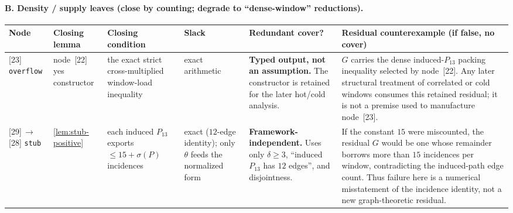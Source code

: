 \documentclass[11pt]{article}
\begin{document}
\paragraph{B. Density / supply leaves (close by counting; degrade to ``dense-window'' reductions).}
{\scriptsize\setlength{\tabcolsep}{3pt}
\begin{longtable}{L{0.09\textwidth} L{0.095\textwidth} L{0.15\textwidth} L{0.08\textwidth} L{0.105\textwidth} L{0.335\textwidth}}
\toprule
\textbf{Node} & \textbf{Closing lemma} & \textbf{Closing condition} & \textbf{Slack} & \textbf{Redundant cover?} & \textbf{Residual counterexample (if false, no cover)} \\
\midrule
\endhead
{[23]} \texttt{overflow} & node~[22] yes constructor & the exact strict cross-multiplied window-load inequality & exact arithmetic & \textbf{Typed output, not an assumption.} The constructor is retained for the later hot/cold analysis. & $G$ carries the dense induced-$P_{13}$ packing inequality selected by node~[22].  Any later structural treatment of correlated or cold windows consumes this retained residual; it is not a premise used to manufacture node~[23]. \\
{[29]}\,$\to$\,{[28]} \texttt{stub} & \cref{lem:stub-positive} & each induced $P_{13}$ exports $\le15+\sigma(P)$ incidences & exact ($12$-edge identity); only $\theta$ feeds the normalized form & \textbf{Framework-independent.} Uses only $\delta\ge3$, ``induced $P_{13}$ has $12$ edges'', and disjointness. & If the constant $15$ were miscounted, the residual $G$ would be one whose remainder borrows more than $15$ incidences per window, contradicting the induced-path edge count. Thus failure here is a numerical misstatement of the incidence identity, not a new graph-theoretic residual. \\
\bottomrule
\end{longtable}
}
\end{document}

